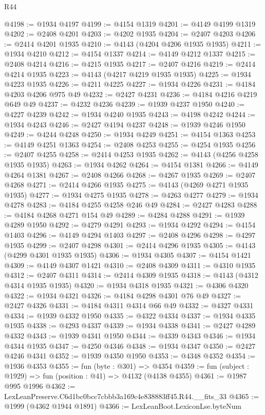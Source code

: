 \begin{lexlean}{R44}
\begin{coremodule}
@4198 := @1934 @4197
@4199 := @4154 @1319
@4201 := @4149 @4199 @1319
@4202 := @2408 @4201
@4203 := @4202 @1935
@4204 := @2407 @4203
@4206 := @2414 @4201 @1935
@4210 := @4143 (@4204 @4206 @1935 @1935)
@4211 := @1934 @4210
@4212 := @4154 @1337
@4214 := @4149 @4212 @1337
@4215 := @2408 @4214
@4216 := @4215 @1935
@4217 := @2407 @4216
@4219 := @2414 @4214 @1935
@4223 := @4143 (@4217 @4219 @1935 @1935)
@4225 := @1934 @4223 @1935
@4226 := @4211 @4225
@4227 := @1934 @4226
@4231 := @4184 @4203 @4206 @975 @49
@4232 := @2427 @4231
@4236 := @4184 @4216 @4219 @649 @49
@4237 := @4232 @4236
@4239 := @1939 @4237 @1950
@4240 := @4227 @4239
@4242 := @1934 @4240 @1935
@4243 := @4198 @4242
@4244 := @1934 @4243
@4246 := @2427 @4194 @4237
@4248 := @1939 @4246 @1950
@4249 := @4244 @4248
@4250 := @1934 @4249
@4251 := @4154 @1363
@4253 := @4149 @4251 @1363
@4254 := @2408 @4253
@4255 := @4254 @1935
@4256 := @2407 @4255
@4258 := @2414 @4253 @1935
@4262 := @4143 (@4256 @4258 @1935 @1935)
@4263 := @1934 @4262
@4264 := @4154 @1381
@4266 := @4149 @4264 @1381
@4267 := @2408 @4266
@4268 := @4267 @1935
@4269 := @2407 @4268
@4271 := @2414 @4266 @1935
@4275 := @4143 (@4269 @4271 @1935 @1935)
@4277 := @1934 @4275 @1935
@4278 := @4263 @4277
@4279 := @1934 @4278
@4283 := @4184 @4255 @4258 @246 @49
@4284 := @2427 @4283
@4288 := @4184 @4268 @4271 @154 @49
@4289 := @4284 @4288
@4291 := @1939 @4289 @1950
@4292 := @4279 @4291
@4293 := @1934 @4292
@4294 := @4154 @1403
@4296 := @4149 @4294 @1403
@4297 := @2408 @4296
@4298 := @4297 @1935
@4299 := @2407 @4298
@4301 := @2414 @4296 @1935
@4305 := @4143 (@4299 @4301 @1935 @1935)
@4306 := @1934 @4305
@4307 := @4154 @1421
@4309 := @4149 @4307 @1421
@4310 := @2408 @4309
@4311 := @4310 @1935
@4312 := @2407 @4311
@4314 := @2414 @4309 @1935
@4318 := @4143 (@4312 @4314 @1935 @1935)
@4320 := @1934 @4318 @1935
@4321 := @4306 @4320
@4322 := @1934 @4321
@4326 := @4184 @4298 @4301 @76 @49
@4327 := @2427 @4326
@4331 := @4184 @4311 @4314 @66 @49
@4332 := @4327 @4331
@4334 := @1939 @4332 @1950
@4335 := @4322 @4334
@4337 := @1934 @4335 @1935
@4338 := @4293 @4337
@4339 := @1934 @4338
@4341 := @2427 @4289 @4332
@4343 := @1939 @4341 @1950
@4344 := @4339 @4343
@4346 := @1934 @4344 @1935
@4347 := @4250 @4346
@4348 := @1934 @4347
@4350 := @2427 @4246 @4341
@4352 := @1939 @4350 @1950
@4353 := @4348 @4352
@4354 := @1936 @4353
@4355 := fun (byte : @301) => @4354
@4359 := fun (subject : @1929) => fun (position : @41) => @4132 (@4138 @4355)
@4361 := @1987 @995 @1996
@4362 := LexLeanPreserve.C6d1bc0bcc7cbbb3a169c4e838883ff45.R44.__fits_33
@4365 := @1999 (@4362 @1944 @1891)
@4366 := LexLeanBoot.LexiconLse.byteNum

\end{coremodule}
\end{lexlean}
